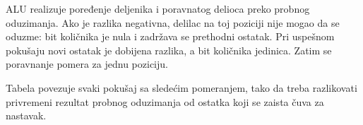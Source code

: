 ALU realizuje poređenje deljenika i poravnatog delioca preko probnog oduzimanja. Ako je razlika negativna, delilac na toj poziciji nije mogao da se oduzme: bit količnika je nula i zadržava se prethodni ostatak. Pri uspešnom pokušaju novi ostatak je dobijena razlika, a bit količnika jedinica. Zatim se poravnanje pomera za jednu poziciju.

Tabela povezuje svaki pokušaj sa sledećim pomeranjem, tako da treba razlikovati privremeni rezultat probnog oduzimanja od ostatka koji se zaista čuva za nastavak.
